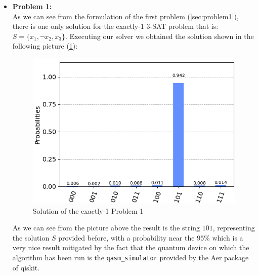 \documentclass[english]{article}
\begin{document}
				\begin{itemize}
					\item \textbf{Problem 1:} \\
						As we can see from the formulation of the first problem (\ref{sec:problem1}), there is one only solution for the exactly-1 3-SAT problem that is: $S=\{x_1, \neg x_2, x_3\}$. Executing our solver we obtained the solution shown in the following picture (\ref{fig:problem1Solution}):
						\begin{figure}[h]
							\centering
							\includegraphics[scale=0.35]{Problem_1_Solution.png}
							\caption{
								\label{fig:problem1Solution}
								Solution of the exactly-1 Problem 1 
							}
						\end{figure}
					
						As we can see from the picture above the result is the string $101$, representing the solution $S$ provided before, with a probability near the $95\%$ which is a very nice result mitigated by the fact that the quantum device on which the algorithm has been run is the \texttt{qasm\_simulator} provided by the Aer package of qiskit.
					

\end{itemize}
\end{document}
